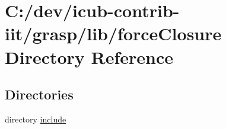 \section{C\+:/dev/icub-\/contrib-\/iit/grasp/lib/force\+Closure Directory Reference}
\label{dir_f375650fa9e3ae8819212e22ba1b427c}
\subsection*{Directories}
\begin{DoxyCompactItemize}
\item 
directory \hyperlink{dir_d8f9ef01124e635b60b21343b3204e1b}{include}
\end{DoxyCompactItemize}
